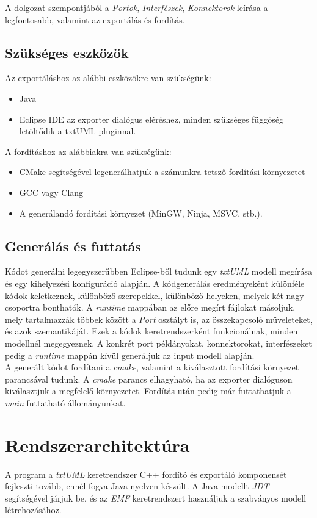 \documentclass[a4paper,12pt]{report}
\begin{document}
A dolgozat szempontjából a \textit{Portok}, \textit{Interfészek}, \textit{Konnektorok} leírása a legfontosabb, valamint az exportálás és fordítás.

\subsection{Szükséges eszközök}
Az exportáláshoz az alábbi eszközökre van szükségünk:
\begin{itemize}
\item Java
\item Eclipse IDE az exporter dialógus eléréshez, minden szükséges függőség letöltődik a txtUML pluginnal.
\end{itemize}

A fordításhoz az alábbiakra van szükségünk:
\begin{itemize}
\item CMake segítségével legenerálhatjuk a számunkra tetsző fordítási környezetet
\item GCC vagy Clang
\item A generálandó fordítási környezet (MinGW, Ninja, MSVC, stb.).
\end{itemize}

\subsection{Generálás és futtatás}
Kódot generálni legegyszerűbben Eclipse-ből tudunk egy \textit{txtUML} modell megírása és egy kihelyezési konfiguráció alapján. A kódgenerálás eredményeként különféle kódok keletkeznek, különböző szerepekkel, különböző helyeken, melyek két nagy csoportra bonthatók.  A \textit{runtime} mappában az előre megírt fájlokat másoljuk, mely tartalmazzák többek között a \textit{Port} osztályt is, az összekapcsoló műveleteket, és azok szemantikáját. Ezek a kódok keretrendszerként funkcionálnak, minden modellnél megegyeznek. A konkrét port példányokat, konnektorokat, interfészeket pedig a \textit{runtime} mappán kívül generáljuk az input modell alapján. \\

A generált kódot fordítani a \textit{cmake}, valamint a kiválasztott fordítási környezet parancsával tudunk. A \textit{cmake} parancs elhagyható, ha az exporter dialóguson kiválasztjuk a megfelelő környezetet. Fordítás után pedig már futtathatjuk a \textit{main} futtatható állományunkat.

\section{Rendszerarchitektúra}
A program a \textit{txtUML} keretrendszer C++ fordító és exportáló komponensét fejleszti tovább, ennél fogva Java nyelven készült. A Java modellt \textit{JDT} segítségével járjuk be, és az \textit{EMF} keretrendszert használjuk a szabványos modell létrehozásához. \\
\end{document}
